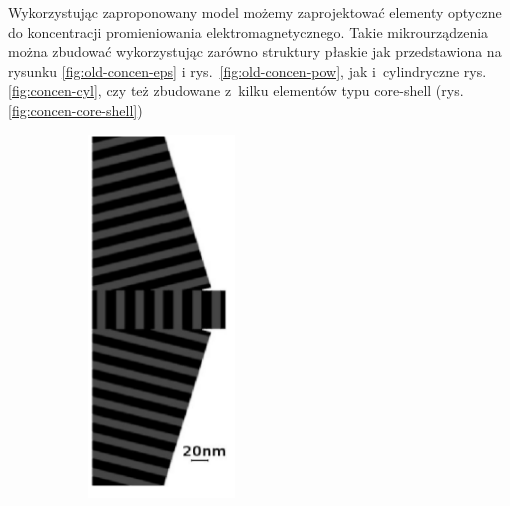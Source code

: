 Wykorzystując zaproponowany model możemy zaprojektować elementy optyczne do koncentracji promieniowania elektromagnetycznego. Takie mikrourządzenia można zbudować wykorzystując zarówno struktury płaskie jak przedstawiona na rysunku \ref{fig:old-concen-eps} i rys.~\ref{fig:old-concen-pow}, jak i~cylindryczne rys.\ref{fig:concen-cyl}, czy też zbudowane z~kilku elementów typu core-shell (rys. \ref{fig:concen-core-shell})
\begin{figure}[!htb]
	\centering
	\begin{subfigure}[b]{.45\textwidth}
		\includegraphics[angle=90,width=\textwidth]{images/multilayer/konc_eps_mgr.png}

\end{subfigure}
\end{figure}
